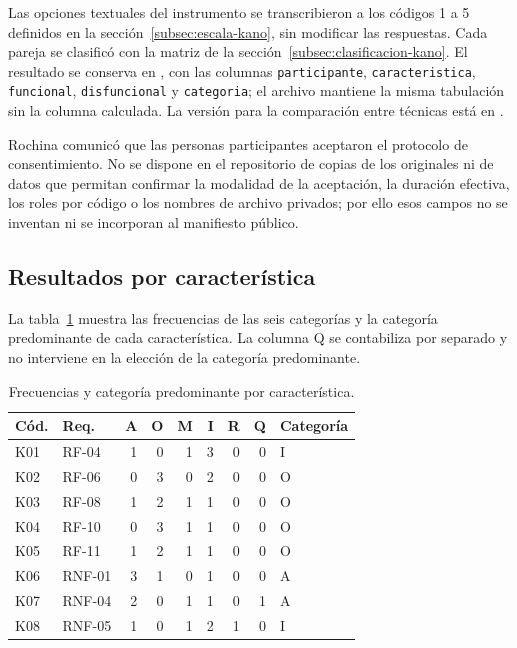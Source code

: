 Las opciones textuales del instrumento se transcribieron a los códigos 1 a 5 definidos en la sección~\ref{subsec:escala-kano}, sin modificar las respuestas. Cada pareja se clasificó con la matriz de la sección~\ref{subsec:clasificacion-kano}. El resultado se conserva en , con las columnas \texttt{participante}, \texttt{caracteristica}, \texttt{funcional}, \texttt{disfuncional} y \texttt{categoria}; el archivo  mantiene la misma tabulación sin la columna calculada. La versión para la comparación entre técnicas está en .

Rochina comunicó que las personas participantes aceptaron el protocolo de consentimiento. No se dispone en el repositorio de copias de los originales ni de datos que permitan confirmar la modalidad de la aceptación, la duración efectiva, los roles por código o los nombres de archivo privados; por ello esos campos no se inventan ni se incorporan al manifiesto público.

\subsection{Resultados por característica}
\label{subsec:resultados-kano}

La tabla~\ref{tab:resultados-kano} muestra las frecuencias de las seis categorías y la categoría predominante de cada característica. La columna Q se contabiliza por separado y no interviene en la elección de la categoría predominante.

\begin{table}[htbp]
\centering
\footnotesize
\setlength{\tabcolsep}{3pt}
\caption{Frecuencias y categoría predominante por característica.}
\label{tab:resultados-kano}
\begin{tabular}{@{}llrrrrrrl@{}}
\toprule
Cód. & Req. & A & O & M & I & R & Q & Categoría \\
\midrule
K01 & RF-04  & 1 & 0 & 1 & 3 & 0 & 0 & I \\
K02 & RF-06  & 0 & 3 & 0 & 2 & 0 & 0 & O \\
K03 & RF-08  & 1 & 2 & 1 & 1 & 0 & 0 & O \\
K04 & RF-10  & 0 & 3 & 1 & 1 & 0 & 0 & O \\
K05 & RF-11  & 1 & 2 & 1 & 1 & 0 & 0 & O \\
K06 & RNF-01 & 3 & 1 & 0 & 1 & 0 & 0 & A \\
K07 & RNF-04 & 2 & 0 & 1 & 1 & 0 & 1 & A \\
K08 & RNF-05 & 1 & 0 & 1 & 2 & 1 & 0 & I \\
\bottomrule
\end{tabular}
\end{table}


